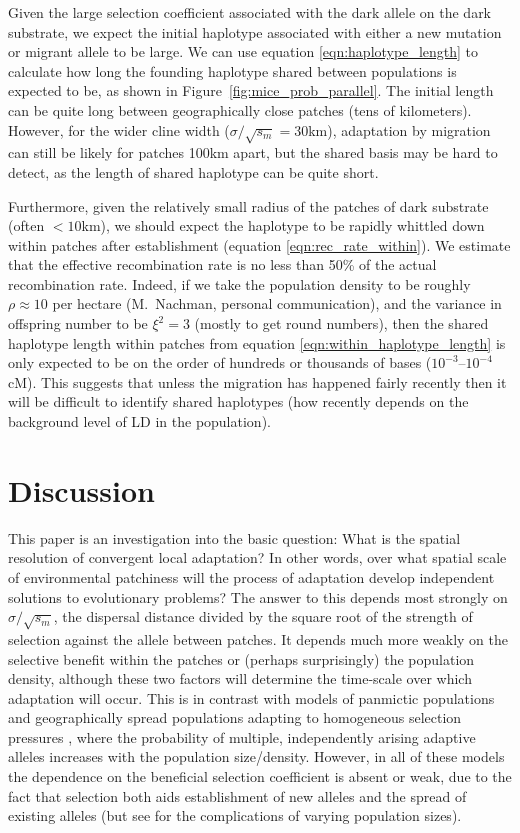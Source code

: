 \documentclass{article}
\newcommand{\citep}[1]{\cite{#1}}
\newcommand{\citet}[1]{\cite{#1}}
\begin{document}
Given the large selection coefficient associated with the dark allele
on the dark substrate, we expect the initial haplotype associated with
either a new mutation or migrant allele to be large. 
We can use equation \eqref{eqn:haplotype_length} to calculate how long the founding
haplotype shared between populations is expected to be,
as shown in Figure~\ref{fig:mice_prob_parallel}. 
The initial length can be quite long between geographically close patches (tens of kilometers). 
However, for the wider cline width ($\sigma/\sqrt{s_m} = 30$km), 
adaptation by migration can still be likely for patches 100km apart, 
but the shared basis may be hard to detect, as the length of shared haplotype can be quite short. 

Furthermore, given the relatively small radius of the patches of dark substrate (often $<10$km),
we should expect the haplotype to be rapidly whittled down within
patches after establishment (equation \ref{eqn:rec_rate_within}). We
estimate that the effective recombination rate is no less than 50\% of the actual recombination rate.
Indeed, if we take the population density to be roughly $\rho \approx 10$ per hectare 
(M.~Nachman, personal communication),
and the variance in offspring number to be $\xi^2 = 3$ (mostly to get round numbers),
then the shared haplotype length within patches from equation \eqref{eqn:within_haplotype_length}
is only expected to be on the order of hundreds or thousands of bases
($10^{-3}$--$10^{-4}$cM).
This suggests that unless the migration has happened fairly recently
then it will be difficult to identify shared haplotypes
(how recently depends on the background level of LD in the population).


\section*{Discussion} 
\label{ss:discussion}

This paper is an investigation into the basic question: 
What is the spatial resolution of convergent local adaptation?
In other words, 
over what spatial scale of environmental patchiness will the process
of adaptation develop independent solutions to evolutionary problems?
The answer to this depends most strongly on $\sigma/\sqrt{s_m}$, 
the dispersal distance divided by the square root of the strength of selection against the allele between patches. 
It depends much more weakly on the
selective benefit within the patches or (perhaps surprisingly) the population density, 
although these two factors will determine the time-scale over which adaptation will occur. 
This is in contrast with models of panmictic populations
\citep{softsweepsI, MesserPetrov, Wilson-softsweep} 
and geographically spread populations adapting to homogeneous selection pressures \citep{ralph2010parallel}, 
where the probability of multiple, independently arising adaptive alleles increases with the population size/density. 
However, in all of these models the dependence on the beneficial selection
coefficient is absent or weak, due to the fact that selection both
aids establishment of new alleles and the spread of existing
alleles (but see \citet{Wilson-softsweep} for the complications of varying population sizes). 
\end{document}
